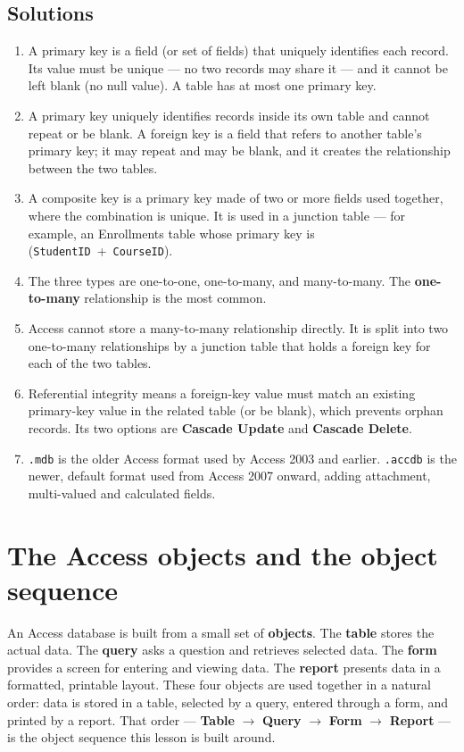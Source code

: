 \subsection*{Solutions}
\begingroup\small
\begin{enumerate}[label=\arabic*.]
  \item A primary key is a field (or set of fields) that uniquely identifies
    each record. Its value must be unique --- no two records may share it ---
    and it cannot be left blank (no null value). A table has at most one
    primary key.
  \item A primary key uniquely identifies records inside its own table and
    cannot repeat or be blank. A foreign key is a field that refers to another
    table's primary key; it may repeat and may be blank, and it creates the
    relationship between the two tables.
  \item A composite key is a primary key made of two or more fields used
    together, where the combination is unique. It is used in a junction table
    --- for example, an Enrollments table whose primary key is
    (\texttt{StudentID}~+~\texttt{CourseID}).
  \item The three types are one-to-one, one-to-many, and many-to-many. The
    \textbf{one-to-many} relationship is the most common.
  \item Access cannot store a many-to-many relationship directly. It is split
    into two one-to-many relationships by a junction table that holds a
    foreign key for each of the two tables.
  \item Referential integrity means a foreign-key value must match an existing
    primary-key value in the related table (or be blank), which prevents
    orphan records. Its two options are \textbf{Cascade Update} and
    \textbf{Cascade Delete}.
  \item \texttt{.mdb} is the older Access format used by Access 2003 and
    earlier. \texttt{.accdb} is the newer, default format used from Access
    2007 onward, adding attachment, multi-valued and calculated fields.
\end{enumerate}
\endgroup

\section{The Access objects and the object sequence}
An Access database is built from a small set of \textbf{objects}. The
\textbf{table} stores the actual data. The \textbf{query} asks a question
and retrieves selected data. The \textbf{form} provides a screen for
entering and viewing data. The \textbf{report} presents data in a formatted,
printable layout. These four objects are used together in a natural order:
data is stored in a table, selected by a query, entered through a form, and
printed by a report. That order --- \textbf{Table} $\rightarrow$
\textbf{Query} $\rightarrow$ \textbf{Form} $\rightarrow$ \textbf{Report}
--- is the object sequence this lesson is built around.

